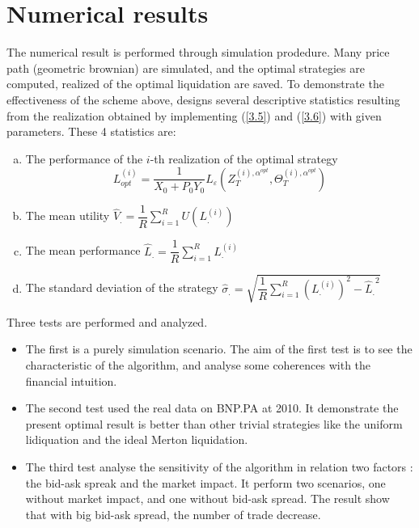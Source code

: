 \documentclass{article}
\begin{document}
\section{Numerical results}
\par The numerical result is performed through simulation prodedure. Many price path (geometric brownian) are simulated, and the optimal strategies are computed, realized of the optimal liquidation are saved. To demonstrate the effectiveness of the scheme above, \cite{GMP} designs several descriptive statistics resulting from the realization obtained by implementing (\ref{3.5}) and (\ref{3.6}) with given parameters. These 4 statistics are: 
\begin{enumerate}[(a)]
  \setlength{\parskip}{0pt}
  \setlength{\parsep}{0pt}
\item The performance of the $i$-th realization of the optimal strategy
\[
L_{opt}^{(i)} = \frac{1}{{{X_0} + {P_0}{Y_0}}}{L_\varepsilon }\left( {Z_T^{(i),{\alpha ^{opt}}},\Theta _T^{(i),{\alpha ^{opt}}}} \right)
\]
\item The mean utility ${\widehat V_.} = \dfrac{1}{R}\sum\limits_{i = 1}^R {U\left( {L_.^{(i)}} \right)}$
\item The mean performance ${\widehat L_.} = \dfrac{1}{R}\sum\limits_{i = 1}^R {L_.^{(i)}}$
\item The standard deviation of the strategy ${\widehat \sigma _.} = \sqrt {\dfrac{1}{R}\sum\limits_{i = 1}^R {{{\left( {L_.^{(i)}} \right)}^2}}  - {{\widehat L}_.}^2}$
\end{enumerate}
Three tests are performed and analyzed. 
\begin{itemize}
 \item The first is a purely simulation scenario. The aim of the first test is to see the characteristic of the algorithm, and analyse some coherences with the financial intuition.
 \item The second test used the real data on BNP.PA at 2010. It demonstrate the present optimal result is better than other trivial strategies like the uniform lidiquation and the ideal Merton liquidation.
 \item The third test analyse the sensitivity of the algorithm in relation two factors : the bid-ask spreak and the market impact. It perform two scenarios, one without market impact, and one without bid-ask spread. The result show that with big bid-ask spread, the number of trade decrease. 
\end{itemize}
\end{document}
